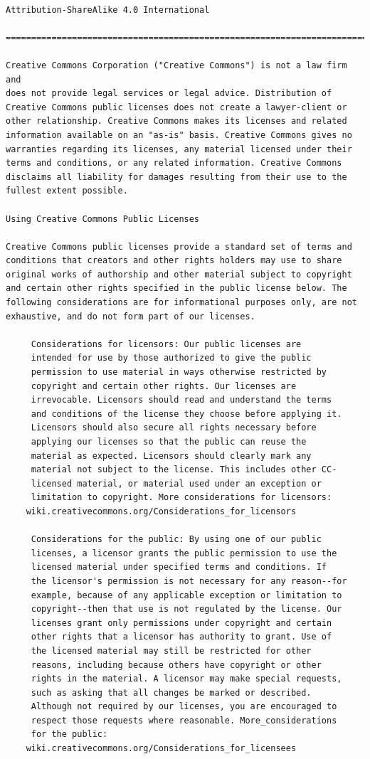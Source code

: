 \documentclass[12pt,spanish,]{scrartcl}
\begin{document}
\begin{verbatim}

Attribution-ShareAlike 4.0 International

=======================================================================

Creative Commons Corporation ("Creative Commons") is not a law firm and
does not provide legal services or legal advice. Distribution of
Creative Commons public licenses does not create a lawyer-client or
other relationship. Creative Commons makes its licenses and related
information available on an "as-is" basis. Creative Commons gives no
warranties regarding its licenses, any material licensed under their
terms and conditions, or any related information. Creative Commons
disclaims all liability for damages resulting from their use to the
fullest extent possible.

Using Creative Commons Public Licenses

Creative Commons public licenses provide a standard set of terms and
conditions that creators and other rights holders may use to share
original works of authorship and other material subject to copyright
and certain other rights specified in the public license below. The
following considerations are for informational purposes only, are not
exhaustive, and do not form part of our licenses.

     Considerations for licensors: Our public licenses are
     intended for use by those authorized to give the public
     permission to use material in ways otherwise restricted by
     copyright and certain other rights. Our licenses are
     irrevocable. Licensors should read and understand the terms
     and conditions of the license they choose before applying it.
     Licensors should also secure all rights necessary before
     applying our licenses so that the public can reuse the
     material as expected. Licensors should clearly mark any
     material not subject to the license. This includes other CC-
     licensed material, or material used under an exception or
     limitation to copyright. More considerations for licensors:
    wiki.creativecommons.org/Considerations_for_licensors

     Considerations for the public: By using one of our public
     licenses, a licensor grants the public permission to use the
     licensed material under specified terms and conditions. If
     the licensor's permission is not necessary for any reason--for
     example, because of any applicable exception or limitation to
     copyright--then that use is not regulated by the license. Our
     licenses grant only permissions under copyright and certain
     other rights that a licensor has authority to grant. Use of
     the licensed material may still be restricted for other
     reasons, including because others have copyright or other
     rights in the material. A licensor may make special requests,
     such as asking that all changes be marked or described.
     Although not required by our licenses, you are encouraged to
     respect those requests where reasonable. More_considerations
     for the public: 
    wiki.creativecommons.org/Considerations_for_licensees


\end{verbatim}
\end{document}
